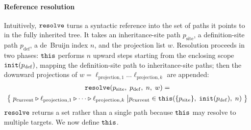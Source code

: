 \paragraph{Reference resolution}
Intuitively, $\mathtt{resolve}$ turns a syntactic reference into the
set of paths it points to in the fully inherited tree.
It takes an inheritance-site path $p_{\mathrm{site}}$,
a definition-site path $p_{\mathrm{def}}$,
a de~Bruijn index $n$,
and the projection list $w$.
Resolution proceeds in two phases:
$\mathtt{this}$ performs $n$ upward steps
starting from the enclosing scope $\mathtt{init}(p_{\mathrm{def}})$,
mapping the definition-site path to inheritance-site paths;
then the downward projections of
$w = \ell_{\mathrm{projection},1}\ldots\ell_{\mathrm{projection},k}$
are appended:
\begin{multline}\label{eq:resolve}
  \mathtt{resolve}(p_{\mathrm{site}},\; p_{\mathrm{def}},\; n,\; w)
  = \\
  \bigl\{\;
    p_{\mathrm{current}} \mathbin{\triangleright} \ell_{\mathrm{projection},1} \mathbin{\triangleright} \cdots \mathbin{\triangleright} \ell_{\mathrm{projection},k}
    \;\big|
    p_{\mathrm{current}} \in
    \mathtt{this}(\{p_{\mathrm{site}}\},\; \mathtt{init}(p_{\mathrm{def}}),\; n)
  \;\bigr\}
\end{multline}
$\mathtt{resolve}$ returns a set rather than a single path because
$\mathtt{this}$ may resolve to multiple targets.
We now define $\mathtt{this}$.

